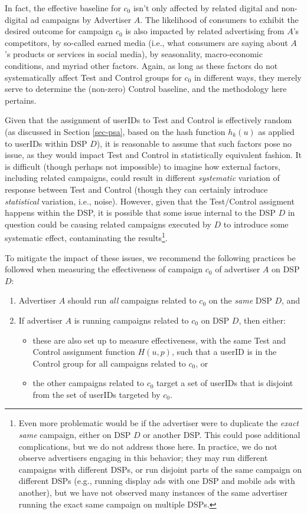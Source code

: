 \documentclass[11pt,a4paper]{article}
\theoremstyle{definition}
\theoremstyle{remark}
\theoremstyle{definition}
\theoremstyle{definition}
\theoremstyle{definition}
\theoremstyle{definition}
\theoremstyle{definition}
\theoremstyle{definition}
\begin{document}
In fact, the effective baseline for $c_0$ isn't only affected by related digital and non-digital ad campaigns by Advertiser $A$. The likelihood of consumers to exhibit the desired outcome for campaign $c_0$ is also impacted by  related advertising from $A$'s competitors, by so-called earned media (i.e., what consumers are saying about $A$'s products or services in social media), by seasonality, macro-economic conditions, and myriad other factors. Again, as long as these factors do not systematically affect Test and Control groups for $c_0$ in different ways, they merely serve to determine the (non-zero) Control baseline, and the methodology here pertains. 

Given that the assignment of userIDs to Test and Control is effectively random (as discussed in Section \ref{sec-psa}, based on the hash function $h_k(u)$ as applied to userIDs within DSP $D$), it is reasonable to assume that such factors pose no issue, as they would impact Test and Control in statistically equivalent fashion. It is difficult (though perhaps not impossible) to imagine how external factors, including related campaigns, could result in different \textit{systematic} variation of response between Test and Control (though they can certainly introduce \textit{statistical} variation, i.e., noise). However, given that the Test/Control assigment happens within the DSP, it is possible that some issue internal to the DSP $D$ in question could be causing related campaigns executed by $D$ to introduce some systematic effect, contaminating the results\footnote{Even more problematic would be if the advertiser were to duplicate the {\em exact same} campaign, either on DSP $D$ or another DSP. This could pose additional complications, but we do not address those here. In practice, we do not observe advertisers engaging in this behavior; they may run different campaigns with different DSPs, or run disjoint parts of the same campaign on different DSPs (e.g., running display ads with one DSP and mobile ads with another), but we have not observed many instances of the same advertiser running the exact same campaign on multiple DSPs.}.

To mitigate the impact of these issues, we recommend the following practices be followed when measuring the effectiveness of campaign $c_0$ of advertiser $A$ on DSP $D$:

\begin{enumerate}
		\item Advertiser $A$ should run \textit{all} campaigns related to $c_0$  on the \textit{same} DSP $D$, and 
		\item If advertiser $A$ is running campaigns related to $c_0$ on DSP $D$, then either:
	\begin{itemize}
		\item these are also set up to measure effectiveness, with the same Test and Control assignment function $H(u,p)$, such that a userID is in the Control group for all campaigns related to $c_0$, or
		\item the other campaigns related to $c_0$ target a set of userIDs that is disjoint from the set of userIDs targeted by $c_0$. 
	\end{itemize}
\end{enumerate}
\end{document}
